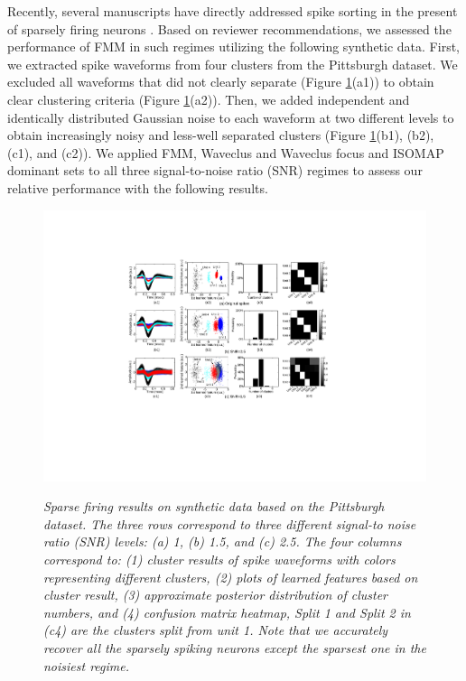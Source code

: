 \documentclass[journal]{IEEEtran}
\begin{document}
Recently, several manuscripts have directly addressed spike sorting in the present of sparsely firing neurons \cite{Pedreira2012, Adamos2012}.  Based on reviewer recommendations, we assessed the performance of FMM in such regimes utilizing the following synthetic data.  First, we extracted spike waveforms from four clusters from the Pittsburgh dataset.  We excluded all waveforms that did not clearly separate (Figure \ref{fig:Sparse_firing_neuron}(a1))
to obtain clear clustering criteria (Figure \ref{fig:Sparse_firing_neuron}(a2)).  Then, we added independent and identically distributed Gaussian noise to each waveform at two different levels to obtain increasingly noisy and less-well separated clusters (Figure \ref{fig:Sparse_firing_neuron}(b1), (b2), (c1), and (c2)).  We applied FMM, Waveclus and Waveclus focus \cite{??} and ISOMAP dominant sets \cite{??} to all three signal-to-noise ratio (SNR) regimes to assess our relative performance with the following results.

\begin{figure}[!htbp]
\centering

   \includegraphics[scale=1,angle=0] {figs_new/sparse_firing.pdf}
   \label{fig:Sparse_firing_neuron}
  \caption{\small \emph{
Sparse firing results on synthetic data based on the Pittsburgh dataset. 
The three rows correspond to three different signal-to noise ratio (SNR) levels: (a) 1, (b) 1.5, and (c) 2.5. The four columns correspond to: (1) cluster results of spike waveforms with colors representing different clusters, (2) plots of learned features  based on cluster result, (3) approximate posterior distribution of cluster numbers, and (4) confusion matrix heatmap, Split 1 and Split 2 in (c4) are the clusters split from unit 1. Note that we accurately recover all the sparsely spiking neurons except the sparsest one in the noisiest regime.
   }}
\end{figure}
\end{document}
